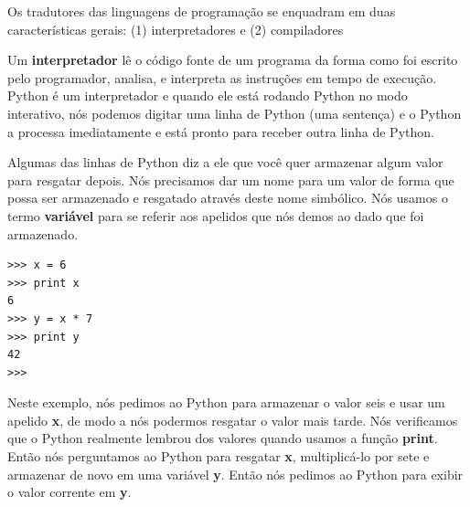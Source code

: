 Os tradutores das linguagens de programação se enquadram em duas
características gerais:
(1) interpretadores e (2) compiladores
%

Um {\bf interpretador} lê o código fonte de um programa da forma como foi escrito
pelo programador, analisa, e interpreta as instruções em tempo de
execução. Python é um interpretador e quando ele está rodando Python no modo
interativo, nós podemos digitar uma linha de Python (uma sentença) e o Python a
processa imediatamente e está pronto para receber outra linha de Python.
%

Algumas das linhas de Python diz a ele que você quer armazenar algum valor
para resgatar depois. Nós precisamos dar um nome para um valor de forma que possa
ser armazenado e resgatado através deste nome simbólico. Nós usamos o termo
{\bf variável} para se referir aos apelidos que nós demos ao dado que foi armazenado.
%

\beforeverb
\begin{verbatim}
>>> x = 6
>>> print x
6
>>> y = x * 7
>>> print y
42
>>>
\end{verbatim}
\afterverb

Neste exemplo, nós pedimos ao Python para armazenar o valor seis e usar um apelido {\bf x}, de modo a nós podermos resgatar o valor mais tarde. Nós verificamos que o Python realmente
lembrou dos valores quando usamos a função {\bf print}. Então nós perguntamos ao Python
para resgatar {\bf x}, multiplicá-lo por sete e armazenar de novo em uma variável {\bf y}.
Então nós pedimos ao Python para exibir o valor corrente em {\bf y}.
%

